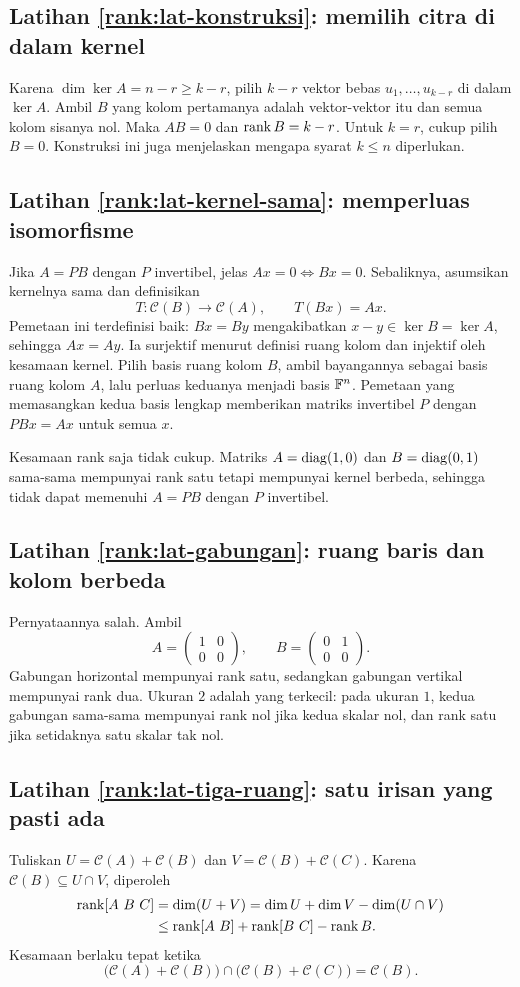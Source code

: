 \subsection*{Latihan \ref{rank:lat-konstruksi}: memilih citra di dalam kernel}
Karena $\dim\ker A=n-r\ge k-r$, pilih $k-r$ vektor bebas
$u_1,\ldots,u_{k-r}$ di dalam $\ker A$.
Ambil $B$ yang kolom pertamanya adalah vektor-vektor itu dan semua
kolom sisanya nol. Maka $AB=0$ dan $\operatorname{rank} B=k-r$.
Untuk $k=r$, cukup pilih $B=0$.
Konstruksi ini juga menjelaskan mengapa syarat $k\le n$ diperlukan.

\subsection*{Latihan \ref{rank:lat-kernel-sama}: memperluas isomorfisme}
Jika $A=PB$ dengan $P$ invertibel, jelas $Ax=0\iff Bx=0$.
Sebaliknya, asumsikan kernelnya sama dan definisikan
\[
    T:\mathcal C(B)\longrightarrow\mathcal C(A),\qquad T(Bx)=Ax.
\]
Pemetaan ini terdefinisi baik: $Bx=By$ mengakibatkan
$x-y\in\ker B=\ker A$, sehingga $Ax=Ay$.
Ia surjektif menurut definisi ruang kolom dan injektif oleh kesamaan kernel.
Pilih basis ruang kolom $B$, ambil bayangannya sebagai basis ruang
kolom $A$, lalu perluas keduanya menjadi basis $\mathbb{F}^n$.
Pemetaan yang memasangkan kedua basis lengkap memberikan matriks
invertibel $P$ dengan $PBx=Ax$ untuk semua $x$.

Kesamaan rank saja tidak cukup. Matriks
$A=\operatorname{diag}(1,0)$ dan $B=\operatorname{diag}(0,1)$ sama-sama mempunyai rank satu tetapi
mempunyai kernel berbeda, sehingga tidak dapat memenuhi $A=PB$
dengan $P$ invertibel.

\subsection*{Latihan \ref{rank:lat-gabungan}: ruang baris dan kolom berbeda}
Pernyataannya salah. Ambil
\[
    A=\begin{pmatrix}1&0\\0&0\end{pmatrix},\qquad
    B=\begin{pmatrix}0&1\\0&0\end{pmatrix}.
\]
Gabungan horizontal mempunyai rank satu, sedangkan gabungan vertikal
mempunyai rank dua. Ukuran $2$ adalah yang terkecil: pada ukuran $1$,
kedua gabungan sama-sama mempunyai rank nol jika kedua skalar nol,
dan rank satu jika setidaknya satu skalar tak nol.

\subsection*{Latihan \ref{rank:lat-tiga-ruang}: satu irisan yang pasti ada}
Tuliskan
$U=\mathcal C(A)+\mathcal C(B)$ dan
$V=\mathcal C(B)+\mathcal C(C)$.
Karena $\mathcal C(B)\subseteq U\cap V$, diperoleh
\begin{align*}
    \operatorname{rank}[A\ B\ C]
    &=\dim(U+V)=\dim U+\dim V-\dim(U\cap V)\\
    &\le\operatorname{rank}[A\ B]+\operatorname{rank}[B\ C]-\operatorname{rank} B.
\end{align*}
Kesamaan berlaku tepat ketika
\[
    \bigl(\mathcal C(A)+\mathcal C(B)\bigr)
    \cap\bigl(\mathcal C(B)+\mathcal C(C)\bigr)=\mathcal C(B).
\]

